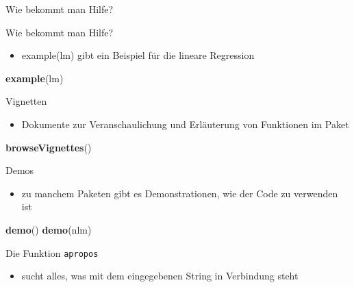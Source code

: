 \documentclass[ignorenonframetext,]{beamer}
\newenvironment{Shaded}{}{}
\newcommand{\KeywordTok}[1]{\textcolor[rgb]{0.00,0.44,0.13}{\textbf{{#1}}}}
\newcommand{\NormalTok}[1]{{#1}}
\providecommand{\tightlist}{%
\setlength{\itemsep}{0pt}\setlength{\parskip}{0pt}}
\begin{document}
\begin{frame}[fragile]{Wie bekommt man Hilfe?}
\begin{block}{Wie bekommt man Hilfe?}
\begin{itemize}
\tightlist
\item
  example(lm) gibt ein Beispiel für die lineare Regression
\end{itemize}

\begin{Shaded}
\begin{Highlighting}[]
\KeywordTok{example}\NormalTok{(lm)}
\end{Highlighting}
\end{Shaded}

\end{block}

\begin{block}{Vignetten}

\begin{itemize}
\tightlist
\item
  Dokumente zur Veranschaulichung und Erläuterung von Funktionen im
  Paket
\end{itemize}

\begin{Shaded}
\begin{Highlighting}[]
\KeywordTok{browseVignettes}\NormalTok{()}
\end{Highlighting}
\end{Shaded}

\end{block}

\begin{block}{Demos}

\begin{itemize}
\tightlist
\item
  zu manchem Paketen gibt es Demonstrationen, wie der Code zu verwenden
  ist
\end{itemize}

\begin{Shaded}
\begin{Highlighting}[]
\KeywordTok{demo}\NormalTok{()}
\KeywordTok{demo}\NormalTok{(nlm)}
\end{Highlighting}
\end{Shaded}

\end{block}

\begin{block}{Die Funktion \texttt{apropos}}

\begin{itemize}
\tightlist
\item
  sucht alles, was mit dem eingegebenen String in Verbindung steht
\end{itemize}


\end{block}
\end{frame}
\end{document}

